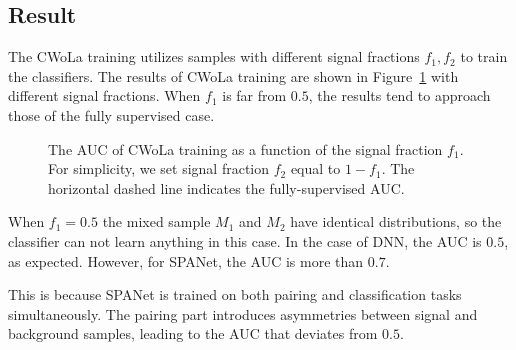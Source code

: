 \documentclass[12pt]{article}
\begin{document}
    \subsection{Result}%
    \label{sub:result}
        The CWoLa training utilizes samples with different signal fractions $f_1,f_2$ to train the classifiers. The results of CWoLa training are shown in Figure~\ref{fig:CWoLa_training_result} with different signal fractions. When $f_1$ is far from $0.5$, the results tend to approach those of the fully supervised case.
        \begin{figure}[htpb]
            \centering
            \caption{The AUC of CWoLa training as a function of the signal fraction $f_1$. For simplicity, we set signal fraction $f_2$ equal to $1 - f_1$. The horizontal dashed line indicates the fully-supervised AUC.}
            \label{fig:CWoLa_training_result}
        \end{figure}

        When $f_1 = 0.5$ the mixed sample $M_1$ and $M_2$ have identical distributions, so the classifier can not learn anything in this case. In the case of DNN, the AUC is $0.5$, as expected. However, for SPANet, the AUC is more than $0.7$.

        This is because SPANet is trained on both pairing and classification tasks simultaneously. The pairing part introduces asymmetries between signal and background samples, leading to the AUC that deviates from $0.5$.
\end{document}
